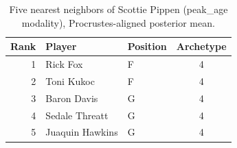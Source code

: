 \begin{table}[htbp]
  \centering\small
  \begin{tabular}{rllc}
    \toprule
    Rank & Player & Position & Archetype \\
    \midrule
    1 & Rick Fox & F & 4 \\
    2 & Toni Kukoc & F & 4 \\
    3 & Baron Davis & G & 4 \\
    4 & Sedale Threatt & G & 4 \\
    5 & Juaquin Hawkins & G & 4 \\
    \bottomrule
  \end{tabular}
  \caption{Five nearest neighbors of Scottie Pippen (peak_age modality), Procrustes-aligned posterior mean.}
  \label{tab:Scottie_Pippen_neighbors_peak_age}
\end{table}

